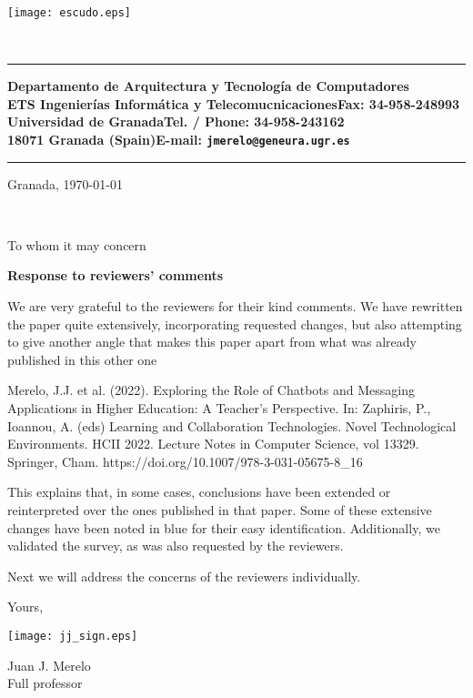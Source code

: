 \documentclass{letter}
\makeatletter
\def\email{\tt jmerelo@geneura.ugr.es}
\def\tel{34-958-243162}
\def\fax{34-958-248993}
\def\granada{18071 Granada (Spain)}
\def\ucm{Universidad de Granada}
\def\fac{ETS Ingenierías Informática y Telecomucnicaciones}
\def\dpto{Departamento de Arquitectura y Tecnolog\'ia de Computadores}
\def\cabecera{

\begin{minipage}{2.5cm}
\centerline{  \texttt{[image: escudo.eps]} }
\end{minipage}
\ \
\begin{minipage}{13cm}
 \rule{13cm}{0.6mm}
 \vspace*{0.3cm}
 {\small{\bf \dpto \hfill}} \\
 {\footnotesize{\bf \fac \hfill Fax: \fax}} \\
 {\footnotesize{\bf \ucm \hfill Tel. / Phone: \tel}} \\
 {\footnotesize{\bf \granada \hfill E-mail: \email}}\\
 \rule{13cm}{0.6mm}
\end{minipage}
}
\makeatother
\begin{document}
\cabecera

\vspace{0.5cm}

\hspace{7cm}

\hfill Granada, \today

\vspace{0.5cm}
\ \
{
\begin{minipage}[t]{9cm}
To whom it may concern
\end{minipage}
 }

\vspace{0.5cm}



{\bf Response to reviewers' comments}

We are very grateful to the reviewers for their kind comments. We have rewritten
the paper quite extensively, incorporating requested changes, but also
attempting to give another angle that makes this paper apart from what was
already published in this other one

Merelo, J.J. et al. (2022). Exploring the Role of Chatbots and Messaging
Applications in Higher Education: A Teacher's Perspective. In: Zaphiris, P.,
Ioannou, A. (eds) Learning and Collaboration Technologies. Novel Technological
Environments. HCII 2022. Lecture Notes in Computer Science, vol 13329. Springer,
Cham. https://doi.org/10.1007/978-3-031-05675-8\_16

This explains that, in some cases, conclusions have been extended or
reinterpreted over the ones published in that paper. Some of these extensive
changes have been noted in blue for their easy identification.
Additionally, we validated
the survey, as was also requested by the reviewers.

Next we will address the concerns of the reviewers individually.


\hspace*{8cm} Yours,  \\

\centerline{\texttt{[image: jj\_sign.eps]}}

\hspace*{8cm} Juan J. Merelo\\
\hspace*{8cm} Full professor
\end{document}
